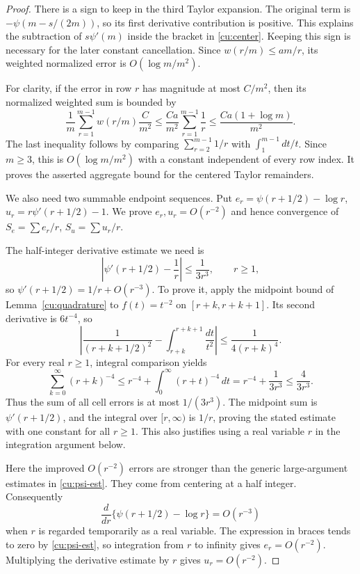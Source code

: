 \begin{proof}
There is a sign to keep in the third Taylor expansion.
The original term is $-\psi(m-s/(2m))$, so its first derivative
contribution is positive. This explains the subtraction of
$s\psi'(m)$ inside the bracket in \eqref{cu:center}. Keeping
this sign is necessary for the later constant cancellation.
Since $w(r/m)\leq am/r$, its weighted normalized error is
$O(\log m/m^2)$.

For clarity, if the error in row $r$ has magnitude at most
$C/m^2$, then its normalized weighted sum is bounded by
\[
 \frac1m\sum_{r=1}^{m-1}w(r/m)\frac{C}{m^2}
 \leq\frac{Ca}{m^2}\sum_{r=1}^{m-1}\frac1r
 \leq\frac{Ca(1+\log m)}{m^2}.
\]
The last inequality follows by comparing
$\sum_{r=2}^{m-1}1/r$ with $\int_1^{m-1}dt/t$.
Since $m\geq3$, this is $O(\log m/m^2)$ with a constant
independent of every row index. It proves the asserted aggregate
bound for the centered Taylor remainders.

We also need two summable endpoint sequences. Put
$e_r=\psi(r+1/2)-\log r$, $u_r=r\psi'(r+1/2)-1$.
We prove $e_r,u_r=O(r^{-2})$ and hence convergence of
$S_e=\sum e_r/r$, $S_u=\sum u_r/r$.

The half-integer derivative estimate we need is
\[
 \left|\psi'(r+1/2)-\frac1r\right|\leq\frac1{3r^3},
 \qquad r\geq1,
\]
so $\psi'(r+1/2)=1/r+O(r^{-3})$. To prove it, apply the midpoint
bound of Lemma~\ref{cu:quadrature} to $f(t)=t^{-2}$ on
$[r+k,r+k+1]$. Its second derivative is $6t^{-4}$, so
\[
 \left|\frac1{(r+k+1/2)^2}
           -\int_{r+k}^{r+k+1}\frac{dt}{t^2}\right|
           \leq\frac1{4(r+k)^4}.
\]
For every real $r\geq1$, integral comparison yields
\[
 \sum_{k=0}^{\infty}(r+k)^{-4}
 \leq r^{-4}+\int_0^\infty(r+t)^{-4}\,dt
 =r^{-4}+\frac1{3r^3}\leq\frac4{3r^3}.
\]
Thus the sum of all cell errors is at most $1/(3r^3)$.
The midpoint sum is $\psi'(r+1/2)$, and the integral over
$[r,\infty)$ is $1/r$, proving the stated estimate with one
constant for all $r\geq1$. This also justifies using a real
variable $r$ in the integration argument below.

Here the improved $O(r^{-2})$ errors are stronger than the generic
large-argument estimates in \eqref{cu:psi-est}. They come from
centering at a half integer. Consequently
\[
 \frac{d}{dr}\{\psi(r+1/2)-\log r\}=O(r^{-3})
\]
when $r$ is regarded temporarily as a real variable. The expression
in braces tends to zero by \eqref{cu:psi-est}, so integration from
$r$ to infinity gives $e_r=O(r^{-2})$. Multiplying the derivative
estimate by $r$ gives $u_r=O(r^{-2})$.


\end{proof}
